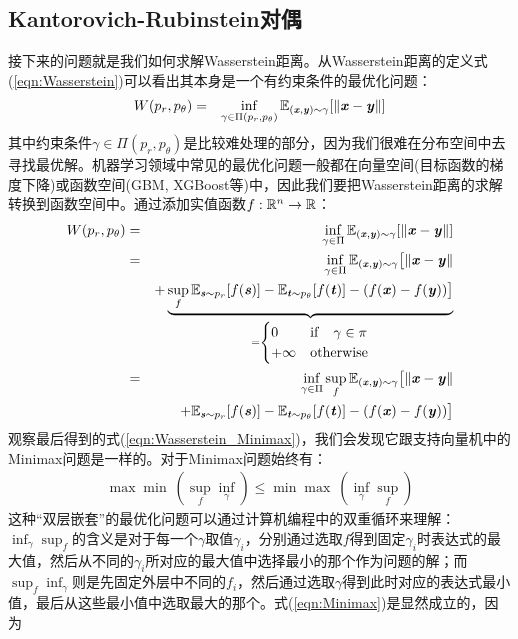 \subsection{Kantorovich-Rubinstein对偶}
接下来的问题就是我们如何求解Wasserstein距离。从Wasserstein距离的定义式(\ref{eqn:Wasserstein})可以看出其本身是一个有约束条件的最优化问题：
\begin{eqnarray}
W(p_{r},p_{\theta}) 
&=& \inf_{\gamma\in\Pi(p_{r},p_{\theta})} \mathbb{E}_{(\boldsymbol{\mathit{x}},\boldsymbol{\mathit{y}})\sim\gamma}[\|\boldsymbol{\mathit{x}}-\boldsymbol{\mathit{y}}\|]\\
\end{eqnarray}
其中约束条件$\gamma\in\Pi(p_{r},p_{\theta})$是比较难处理的部分，因为我们很难在分布空间中去寻找最优解。机器学习领域中常见的最优化问题一般都在向量空间(目标函数的梯度下降)或函数空间(GBM, XGBoost等)中，因此我们要把Wasserstein距离的求解转换到函数空间中。通过添加实值函数$f:\mathbb{R}^{n}\to\mathbb{R}$：
\begin{eqnarray}
W(p_{r},p_{\theta}) 
&=& \inf_{\gamma\in\Pi} \mathbb{E}_{(\boldsymbol{\mathit{x}},\boldsymbol{\mathit{y}})\sim\gamma}[\|\boldsymbol{\mathit{x}}-\boldsymbol{\mathit{y}}\|]\\
&=& \inf_{\gamma\in\Pi} \mathbb{E}_{(\boldsymbol{\mathit{x}},\boldsymbol{\mathit{y}})\sim\gamma}\big{[}\|\boldsymbol{\mathit{x}}-\boldsymbol{\mathit{y}}\| \nonumber\\ 
&& + \underbrace{\sup_{f}\mathbb{E}_{\boldsymbol{\mathit{s}}\sim p_{r}}[f(\boldsymbol{\mathit{s}})] - \mathbb{E}_{\boldsymbol{\mathit{t}}\sim p_{\theta}}[f(\boldsymbol{\mathit{t}})] - (f(\boldsymbol{\mathit{x}})-f(\boldsymbol{\mathit{y}}))\big{]}}_{=
\begin{cases}
0 &\rm{if} \quad \gamma\in\pi \\
+\infty &\rm{otherwise}
\end{cases}
}\\
&=& \inf_{\gamma\in\Pi} \sup_{f} \mathbb{E}_{(\boldsymbol{\mathit{x}},\boldsymbol{\mathit{y}})\sim\gamma}\big{[}\|\boldsymbol{\mathit{x}}-\boldsymbol{\mathit{y}}\| \nonumber\\ 
&& + \mathbb{E}_{\boldsymbol{\mathit{s}}\sim p_{r}}[f(\boldsymbol{\mathit{s}})] - \mathbb{E}_{\boldsymbol{\mathit{t}}\sim p_{\theta}}[f(\boldsymbol{\mathit{t}})] - (f(\boldsymbol{\mathit{x}})-f(\boldsymbol{\mathit{y}}))\big{]} \label{eqn:Wasserstein_Minimax}
\end{eqnarray}
观察最后得到的式(\ref{eqn:Wasserstein_Minimax})，我们会发现它跟支持向量机中的Minimax问题是一样的。对于Minimax问题始终有：
\begin{eqnarray}
\max\min\ (\sup_{f}\inf_{\gamma}) \leq \min\max\ (\inf_{\gamma}\sup_{f}) \label{eqn:Minimax}
\end{eqnarray}
这种“双层嵌套”的最优化问题可以通过计算机编程中的双重循环来理解：$\inf_{\gamma}\sup_{f}$的含义是对于每一个$\gamma$取值$\gamma_{i}$，分别通过选取$f$得到固定$\gamma_{i}$时表达式的最大值，然后从不同的$\gamma_{i}$所对应的最大值中选择最小的那个作为问题的解；而$\sup_{f}\inf_{\gamma}$则是先固定外层中不同的$f_{i}$，然后通过选取$\gamma$得到此时对应的表达式最小值，最后从这些最小值中选取最大的那个。式(\ref{eqn:Minimax})是显然成立的，因为
